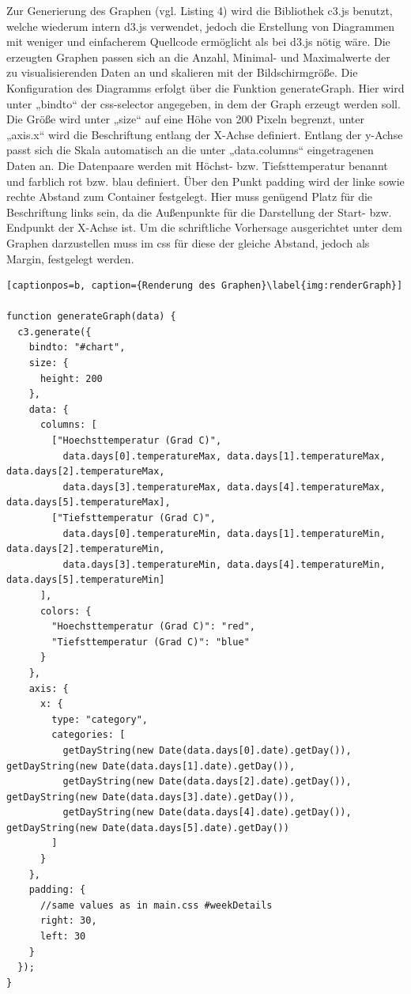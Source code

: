 Zur Generierung des Graphen (vgl. Listing 4) wird die Bibliothek c3.js benutzt, welche wiederum intern d3.js verwendet, jedoch die Erstellung von Diagrammen mit weniger und einfacherem Quellcode ermöglicht als bei d3.js nötig wäre. Die erzeugten Graphen passen sich an die Anzahl, Minimal- und Maximalwerte der zu visualisierenden Daten an und skalieren mit der Bildschirmgröße. Die Konfiguration des Diagramms erfolgt über die Funktion generateGraph. Hier wird unter „bindto“ der css-selector angegeben, in dem der Graph erzeugt werden soll. Die Größe wird unter „size“ auf eine Höhe von 200 Pixeln begrenzt, unter „axis.x“ wird die Beschriftung entlang der X-Achse definiert. Entlang der y-Achse passt sich die Skala automatisch an die unter „data.columns“ eingetragenen Daten an. Die Datenpaare werden mit Höchst- bzw. Tiefsttemperatur benannt und farblich rot bzw. blau definiert. Über den Punkt padding wird der linke sowie rechte Abstand zum Container festgelegt. Hier muss genügend Platz für die Beschriftung links sein, da die Außenpunkte für die Darstellung der Start- bzw. Endpunkt der X-Achse ist. Um die schriftliche Vorhersage ausgerichtet unter dem Graphen darzustellen muss im css für diese der gleiche Abstand, jedoch als Margin, festgelegt werden.

\begin{lstlisting}[captionpos=b, caption={Renderung des Graphen}\label{img:renderGraph}] 

function generateGraph(data) {
  c3.generate({
    bindto: "#chart",
    size: {
      height: 200
    },
    data: {
      columns: [
        ["Hoechsttemperatur (Grad C)",
          data.days[0].temperatureMax, data.days[1].temperatureMax, data.days[2].temperatureMax,
          data.days[3].temperatureMax, data.days[4].temperatureMax, data.days[5].temperatureMax],
        ["Tiefsttemperatur (Grad C)",
          data.days[0].temperatureMin, data.days[1].temperatureMin, data.days[2].temperatureMin,
          data.days[3].temperatureMin, data.days[4].temperatureMin, data.days[5].temperatureMin]
      ],
      colors: {
        "Hoechsttemperatur (Grad C)": "red",
        "Tiefsttemperatur (Grad C)": "blue"
      }
    },
    axis: {
      x: {
        type: "category",
        categories: [
          getDayString(new Date(data.days[0].date).getDay()), getDayString(new Date(data.days[1].date).getDay()),
          getDayString(new Date(data.days[2].date).getDay()), getDayString(new Date(data.days[3].date).getDay()),
          getDayString(new Date(data.days[4].date).getDay()), getDayString(new Date(data.days[5].date).getDay())
        ]
      }
    },
    padding: {
      //same values as in main.css #weekDetails
      right: 30,
      left: 30
    }
  });
}
\end{lstlisting}

